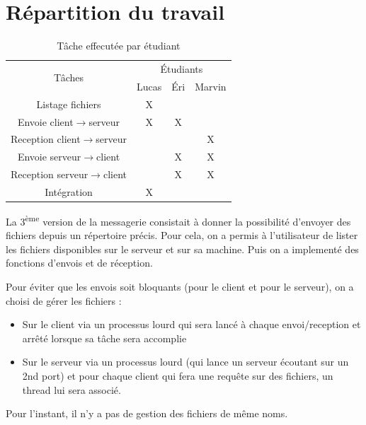\documentclass[a4paper,12pt]{article}
\begin{document}
\section{Répartition du travail}
\begin{table}
	\vspace{-0.5cm}
	\begin{tabular}{cccc}
		\toprule
		\multirow{2}{*}{Tâches} & \multicolumn{3}{c}{Étudiants}\\
		\cmidrule{2-4}
		& Lucas & Éri & Marvin\\
		\midrule
		Listage fichiers & X\\
		\midrule
		Envoie client$\rightarrow$serveur & X & X & \\
		\midrule
		Reception client$\rightarrow$serveur & & &X\\
		\midrule
		Envoie serveur$\rightarrow$client & & X & X\\
		\midrule
		Reception serveur$\rightarrow$client & & X & X\\
		\midrule
		Intégration & X\\
		\bottomrule
	\end{tabular}
	\caption{Tâche effecutée par étudiant}
	\label{table:repartition}
	\vspace{-0.5cm}
\end{table}
La 3\textsuperscript{ème} version de la messagerie consistait à donner la possibilité d'envoyer des fichiers depuis un répertoire précis. Pour cela, on a permis à l'utilisateur de lister les fichiers disponibles sur le serveur et sur sa machine. Puis on a implementé des fonctions d'envois et de réception.

Pour éviter que les envois soit bloquants (pour le client et pour le serveur), on a choisi de gérer les fichiers :
\begin{itemize}
	\item Sur le client via un processus lourd qui sera lancé à chaque envoi/reception et arrêté lorsque sa tâche sera accomplie
 \item Sur le serveur via un processus lourd (qui lance un serveur écoutant sur un 2nd port) et pour chaque client qui fera une requête sur des fichiers, un thread lui sera associé.
\end{itemize}
Pour l'instant, il n'y a pas de gestion des fichiers de même noms.
\end{document}
